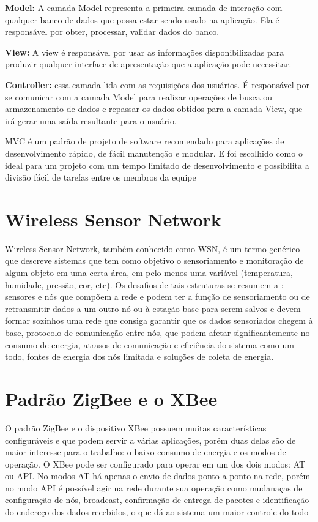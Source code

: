 \textbf{Model:} A camada Model representa a primeira camada de interação com qualquer banco de dados que possa estar sendo usado na aplicação. Ela é responsável por obter, processar, validar dados do banco.

\textbf{View:} A view é responsável por usar as informações disponibilizadas para produzir qualquer interface de apresentação que a aplicação pode necessitar.

\textbf{Controller:} essa camada lida com as requisições dos usuários. É responsável por se comunicar com a camada Model para realizar operações de busca ou armazenamento de dados e repassar os dados obtidos para a camada View, que irá gerar uma saída resultante para o usuário.

MVC é um padrão de projeto de software recomendado para aplicações de desenvolvimento rápido, de fácil manutenção e modular. E foi escolhido como o ideal para um projeto com um tempo limitado de desenvolvimento e possibilita a divisão fácil de tarefas entre os membros da equipe

\section{Wireless Sensor Network }
\label{Sec:WSN}
Wireless Sensor Network, também conhecido como WSN, é um termo genérico que descreve sistemas que tem como objetivo o sensoriamento e monitoração de algum objeto em uma certa área, em pelo menos uma variável (temperatura, humidade, pressão, cor, etc). Os desafios de tais estruturas se resumem a \cite{WSN_survey_JYBMDG_article}: sensores e nós que compõem a rede e podem ter a função de sensoriamento ou de retransmitir dados a um outro nó ou à estação base para serem salvos e devem formar sozinhos uma rede que consiga garantir que os dados sensoriados chegem à base, protocolo de comunicação entre nós, que podem afetar significantemente no consumo de energia, atrasos de comunicação e eficiência do sistema como um todo, fontes de energia dos nós limitada e soluções de coleta de energia. 

\section{Padrão ZigBee e o XBee}
\label{Sec:ZigBee_XBee}
 O padrão ZigBee e o dispositivo XBee possuem muitas características configuráveis e que podem servir a várias aplicações\cite{xbee_book}, porém duas delas são de maior interesse para o trabalho: o baixo consumo de energia e os modos de operação. O XBee pode ser configurado para operar em um dos dois modos: AT ou API. No modos AT há apenas o envio de dados ponto-a-ponto na rede, porém no modo API é possível agir na rede durante sua operação como mudanaças de configuração de nós, broadcast, confirmação de entrega de pacotes e identificação do endereço dos dados recebidos, o que dá ao sistema um maior controle do todo \cite{xbee_documentation}
 
